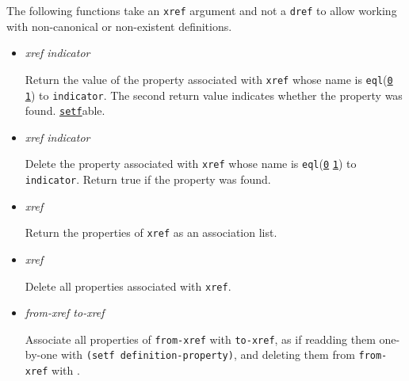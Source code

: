 The following functions take an \texttt{xref} argument and not a
\texttt{dref} to allow working with non-canonical or non-existent
definitions.

\begin{itemize}
\item
  \label{x-28DREF-EXT-3ADEFINITION-PROPERTY-20FUNCTION-29}
  \emph{xref indicator}

  Return the value of the property associated with \texttt{xref} whose
  name is
  \texttt{eql}(\href{http://www.lispworks.com/documentation/HyperSpec/Body/f_eql.htm}{\texttt{0}}
  \href{http://www.lispworks.com/documentation/HyperSpec/Body/t_eql.htm}{\texttt{1}})
  to \texttt{indicator}. The second return value indicates whether the
  property was found.
  \href{http://www.lispworks.com/documentation/HyperSpec/Body/m_setf_.htm}{\texttt{setf}}able.
\item
  \label{x-28DREF-EXT-3ADELETE-DEFINITION-PROPERTY-20FUNCTION-29}
  \emph{xref indicator}

  Delete the property associated with \texttt{xref} whose name is
  \texttt{eql}(\href{http://www.lispworks.com/documentation/HyperSpec/Body/f_eql.htm}{\texttt{0}}
  \href{http://www.lispworks.com/documentation/HyperSpec/Body/t_eql.htm}{\texttt{1}})
  to \texttt{indicator}. Return true if the property was found.
\item
  \label{x-28DREF-EXT-3ADEFINITION-PROPERTIES-20FUNCTION-29}
  \emph{xref}

  Return the properties of \texttt{xref} as an association list.
\item
  \label{x-28DREF-EXT-3ADELETE-DEFINITION-PROPERTIES-20FUNCTION-29}
  \emph{xref}

  Delete all properties associated with \texttt{xref}.
\item
  \label{x-28DREF-EXT-3AMOVE-DEFINITION-PROPERTIES-20FUNCTION-29}
  \emph{from-xref to-xref}

  Associate all properties of \texttt{from-xref} with \texttt{to-xref},
  as if readding them one-by-one with
  \texttt{(setf\ definition-property)}, and deleting them from
  \texttt{from-xref} with
  .
\end{itemize}
